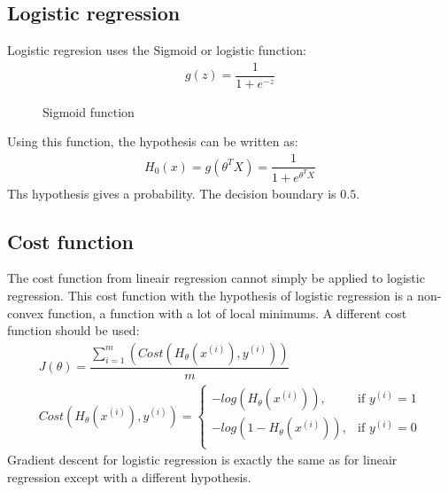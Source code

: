 \subsection{Logistic regression}
Logistic regresion uses the Sigmoid or logistic function:
\begin{align}
g(z) =  \dfrac{1}{1 + e^{-z}}
\end{align}
\begin{figure}[H]
\centering
{}
\caption{Sigmoid function} \label{fig:logregression}
\end{figure}
\noindent Using this function, the hypothesis can be written as:
\begin{align}
H_0(x) = g(\theta^TX) = \dfrac{1}{1 + e^{\theta^TX}}
\end{align}
Ths hypothesis gives a probability. The decision boundary is $0.5$.
\subsection{Cost function}
The cost function from lineair regression cannot simply be applied to logistic regression. This cost function with the hypothesis of logistic regression is a non-convex function, a function with a lot of local minimums. A different cost function should be used:
\begin{gather}
J(\theta) = \dfrac{\sum\limits_{i=1}^m(Cost(H_\theta(x^{(i)}), y^{(i)}))}{m}\\
  Cost(H_\theta(x^{(i)}), y^{(i)}) =	\begin{cases}
        	 									     - log(H_\theta(x^{(i)})), & \text{if } y^{(i)} = 1\\
        									        - log(1 - H_\theta(x^{(i)})), & \text{if } y^{(i)} = 0\\
            									\end{cases}
\end{gather}
Gradient descent for logistic regression is exactly the same as for lineair regression except with a different hypothesis.

